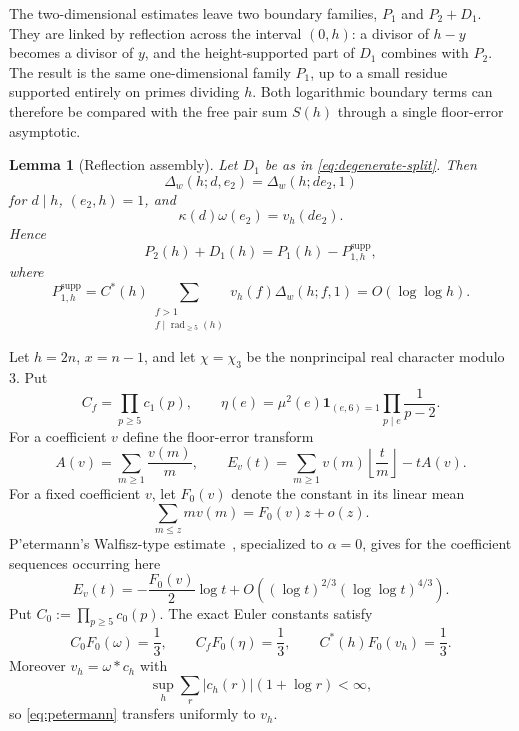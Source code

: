 \documentclass[11pt]{article}
\newtheorem{lemma}[lemma]{Lemma}
\theoremstyle{definition}
\theoremstyle{remark}
\newcommand{\rad}{\operatorname{rad}}
\newcommand{\1}{\mathbf 1}
\newcommand{\om}{\omega}
\newcommand{\llog}{\log\log}
\newcommand{\supp}{\mathrm{supp}}
\newcommand{\modthree}{\chi_3}
\begin{document}
The two-dimensional estimates leave two boundary families, $P_1$ and $P_2+D_1$.  They are linked by reflection across the interval $(0,h)$: a divisor of $h-y$ becomes a divisor of $y$, and the height-supported part of $D_1$ combines with $P_2$.  The result is the same one-dimensional family $P_1$, up to a small residue supported entirely on primes dividing $h$.  Both logarithmic boundary terms can therefore be compared with the free pair sum $S(h)$ through a single floor-error asymptotic.

\begin{lemma}[Reflection assembly]\label{lem:reflection-assembly}
Let $D_1$ be as in \cref{eq:degenerate-split}.  Then
\begin{equation}\label{eq:reflection-row}
\Delta_w(h;d,e_2)=\Delta_w(h;de_2,1)
\end{equation}
for $d\mid h$, $(e_2,h)=1$, and
\begin{equation}\label{eq:reflection-weight}
\kappa(d)\om(e_2)=v_h(de_2).
\end{equation}
Hence
\begin{equation}\label{eq:reflection-assembly}
\boxed{P_2(h)+D_1(h)=P_1(h)-P_{1,h}^{\supp},}
\end{equation}
where
\begin{equation}\label{eq:support-term}
P_{1,h}^{\supp}
 =C^*(h)\sum_{\substack{f>1\\f\mid\rad_{\ge5}(h)}}
 v_h(f)\Delta_w(h;f,1)
 =O(\llog h).
\end{equation}
\end{lemma}

Let $h=2n$, $x=n-1$, and let $\chi=\modthree$ be the nonprincipal real character modulo $3$.  Put
\[
C_f=\prod_{p\ge5}c_1(p),\qquad
\eta(e)=\mu^2(e)\1_{(e,6)=1}\prod_{p\mid e}\frac1{p-2}.
\]
For a coefficient $v$ define the floor-error transform
\begin{equation}\label{eq:Ev}
A(v)=\sum_{m\ge1}\frac{v(m)}m,
\qquad
E_v(t)=\sum_{m\ge1}v(m)\left\lfloor\frac tm\right\rfloor-tA(v).
\end{equation}
For a fixed coefficient $v$, let $F_0(v)$ denote the constant in its linear mean
\[
\sum_{m\le z}m v(m)=F_0(v)z+o(z).
\]
P'etermann's Walfisz-type estimate~\cite{Petermann1998}, specialized to $\alpha=0$, gives for the coefficient sequences occurring here
\begin{equation}\label{eq:petermann}
E_v(t)=-\frac{F_0(v)}2\log t
 +O\!\left((\log t)^{2/3}(\llog t)^{4/3}\right).
\end{equation}
Put $C_0:=\prod_{p\ge5}c_0(p)$.  The exact Euler constants satisfy
\begin{equation}\label{eq:mean-constants}
C_0F_0(\om)=\frac13,\qquad
C_fF_0(\eta)=\frac13,\qquad
C^*(h)F_0(v_h)=\frac13.
\end{equation}
Moreover $v_h=\om*c_h$ with
\begin{equation}\label{eq:ch-moment}
\sup_h\sum_r|c_h(r)|(1+\log r)<\infty,
\end{equation}
so \cref{eq:petermann} transfers uniformly to $v_h$.
\end{document}
